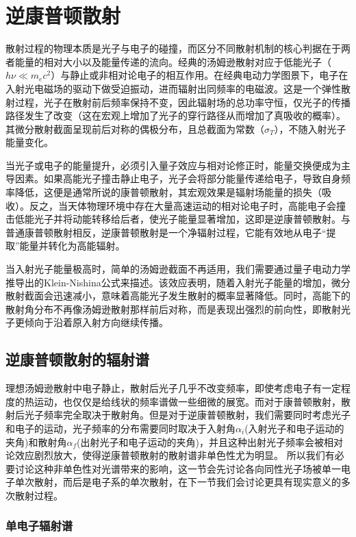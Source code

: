 \chapter{逆康普顿散射}


散射过程的物理本质是光子与电子的碰撞，而区分不同散射机制的核心判据在于两者能量的相对大小以及能量传递的流向。经典的汤姆逊散射对应于低能光子（$h\nu \ll m_e c^2$）与静止或非相对论电子的相互作用。在经典电动力学图景下，电子在入射光电磁场的驱动下做受迫振动，进而辐射出同频率的电磁波。这是一个弹性散射过程，光子在散射前后频率保持不变，因此辐射场的总功率守恒，仅光子的传播路径发生了改变（这在宏观上增加了光子的穿行路径从而增加了真吸收的概率）。其微分散射截面呈现前后对称的偶极分布，且总截面为常数（$\sigma_T$），不随入射光子能量变化。

当光子或电子的能量提升，必须引入量子效应与相对论修正时，能量交换便成为主导因素。如果高能光子撞击静止电子，光子会将部分能量传递给电子，导致自身频率降低，这便是通常所说的康普顿散射，其宏观效果是辐射场能量的损失（吸收）。反之，当天体物理环境中存在大量高速运动的相对论电子时，高能电子会撞击低能光子并将动能转移给后者，使光子能量显著增加，这即是逆康普顿散射。与普通康普顿散射相反，逆康普顿散射是一个净辐射过程，它能有效地从电子“提取”能量并转化为高能辐射。

当入射光子能量极高时，简单的汤姆逊截面不再适用，我们需要通过量子电动力学推导出的Klein-Nishina公式来描述。该效应表明，随着入射光子能量的增加，微分散射截面会迅速减小，意味着高能光子发生散射的概率显著降低。同时，高能下的散射角分布不再像汤姆逊散射那样前后对称，而是表现出强烈的前向性，即散射光子更倾向于沿着原入射方向继续传播。
\section{逆康普顿散射的辐射谱}
理想汤姆逊散射中电子静止，散射后光子几乎不改变频率，即使考虑电子有一定程度的热运动，也仅仅是给线状的频率谱做一些细微的展宽。而对于康普顿散射，散射后光子频率完全取决于散射角。但是对于逆康普顿散射，我们需要同时考虑光子和电子的运动，光子频率的分布需要同时取决于入射角$\alpha_i$(入射光子和电子运动的夹角)和散射角$\alpha_f$(出射光子和电子运动的夹角)，并且这种出射光子频率会被相对论效应剧烈放大，使得逆康普顿散射的散射谱非单色性尤为明显。
所以我们有必要讨论这种非单色性对光谱带来的影响，这一节会先讨论各向同性光子场被单一电子单次散射，而后是电子系的单次散射，在下一节我们会讨论更具有现实意义的多次散射过程。
\subsection{单电子辐射谱}

